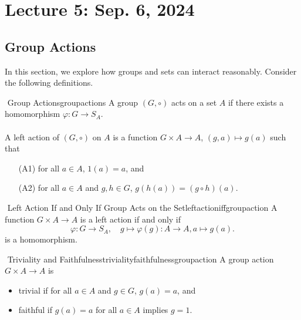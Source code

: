 \pagebreak

\section{Lecture 5: Sep. 6, 2024}

    \subsection{Group Actions}

        In this section, we explore how groups and sets can interact reasonably. Consider the following definitions.
        \begin{definition}{\Stop\,\,Group Actions}{groupactions}
            A group \((G,\circ)\) acts on a set \(A\) if there exists a homomorphism \(\varphi:G\to S_A\).
            \\
            \\
            A left action of \((G,\circ)\) on \(A\) is a function \(G\times A\to A\), \((g,a)\mapsto g(a)\) such that
            \begin{enumerate}
                \item[(A1)] for all \(a\in A\), \(1(a)=a\), and
                \item[(A2)] for all \(a\in A\) and \(g,h\in G\), \(g(h(a))=(g\circ h)(a)\).
            \end{enumerate}
        \end{definition}
        \begin{proposition}{\Stop\,\,Left Action If and Only If Group Acts on the Set}{leftactioniffgroupaction}
            A function \(G\times A\to A\) is a left action if and only if
            \begin{equation*}
                \varphi:G\to S_A, \quad g\mapsto \varphi(g): A\to A, a\mapsto g(a).
            \end{equation*}
            is a homomorphism.
        \end{proposition}
        \begin{definition}{\Stop\,\,Triviality and Faithfulness}{trivialityfaithfulnessgroupaction}
            A group action \(G\times A\to A\) is
            \begin{itemize}
                \item trivial if for all \(a\in A\) and \(g\in G\), \(g(a)=a\), and
                \item faithful if \(g(a)=a\) for all \(a\in A\) implies \(g=1\).
            \end{itemize}
        \end{definition}
